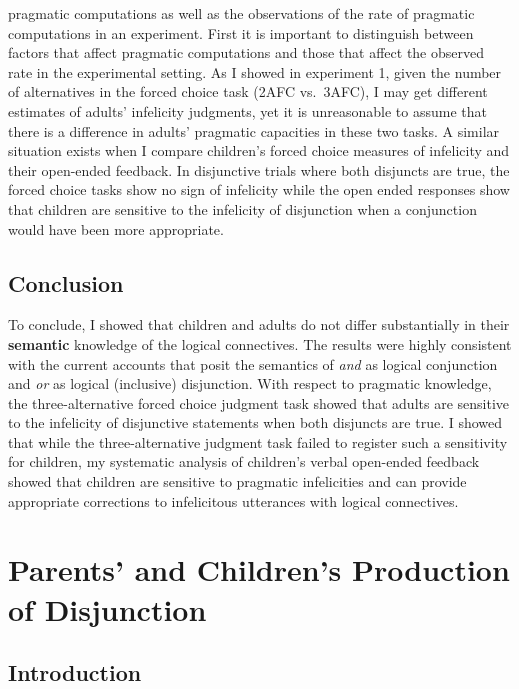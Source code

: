 \documentclass[oneside]{report}
\theoremstyle{definition}
\theoremstyle{definition}
\theoremstyle{definition}
\theoremstyle{remark}
\begin{document}
pragmatic computations as well as the observations of the rate of
pragmatic computations in an experiment. First it is important to
distinguish between factors that affect pragmatic computations and those
that affect the observed rate in the experimental setting. As I showed
in experiment 1, given the number of alternatives in the forced choice
task (2AFC vs.~3AFC), I may get different estimates of adults'
infelicity judgments, yet it is unreasonable to assume that there is a
difference in adults' pragmatic capacities in these two tasks. A similar
situation exists when I compare children's forced choice measures of
infelicity and their open-ended feedback. In disjunctive trials where
both disjuncts are true, the forced choice tasks show no sign of
infelicity while the open ended responses show that children are
sensitive to the infelicity of disjunction when a conjunction would have
been more appropriate.

\section{Conclusion}\label{conclusion}

To conclude, I showed that children and adults do not differ
substantially in their \textbf{semantic} knowledge of the logical
connectives. The results were highly consistent with the current
accounts that posit the semantics of \emph{and} as logical conjunction
and \emph{or} as logical (inclusive) disjunction. With respect to
pragmatic knowledge, the three-alternative forced choice judgment task
showed that adults are sensitive to the infelicity of disjunctive
statements when both disjuncts are true. I showed that while the
three-alternative judgment task failed to register such a sensitivity
for children, my systematic analysis of children's verbal open-ended
feedback showed that children are sensitive to pragmatic infelicities
and can provide appropriate corrections to infelicitous utterances with
logical connectives.

\chapter{Parents' and Children's Production of
Disjunction}\label{corpus}

\section{Introduction}\label{introduction-3}
\end{document}
